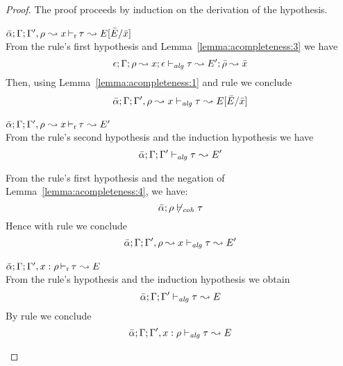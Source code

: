 \begin{proof}
The proof proceeds by induction on the derivation of the hypothesis.
\begin{description}
\setlength{\itemsep}{1em}
\item[\fbox{\texttt{(L-RuleMatch)}}]\quad$\bar{\alpha};\Gamma; \Gamma', \rho~{\leadsto x} \mathop{\vdash_{\mathrm{r}}} \tau~{\leadsto E[\bar{E}/\bar{x}]}$ \ \\
From the rule's first hypothesis and Lemma~\ref{lemma:acompleteness:3} we have
\begin{equation*}
\epsilon; \Gamma; \rho \leadsto x; \epsilon \vdash_{\mathit{alg}} \tau \leadsto E'; \bar{\rho} \leadsto \bar{x}
\end{equation*}
Then, using Lemma~\ref{lemma:acompleteness:1} and rule  we conclude
\begin{equation*}
\bar{\alpha};\Gamma; \Gamma', \rho~{\leadsto x} \vdash_{\mathit{alg}} \tau~{\leadsto E[\bar{E}/\bar{x}]}
\end{equation*}

\item[\fbox{\texttt{(L-RuleNoMatch)}}]\quad$\bar{\alpha};\Gamma;\Gamma', \rho~{\leadsto x}\mathop{\vdash_{\mathrm{r}}} \tau~{\leadsto E'}$ \ \\
  From the rule's second hypothesis and the induction hypothesis we have
\begin{equation*}
  \bar{\alpha};\Gamma;\Gamma' \vdash_{\mathit{alg}} \tau~{\leadsto E'}
\end{equation*}

  From the rule's first hypothesis and the negation of Lemma~\ref{lemma:acompleteness:4}, we have:
\begin{equation*}
\bar{\alpha}; \rho \not\vdash_{\mathit{coh}} \tau
\end{equation*}
  Hence with rule  we conclude
\begin{equation*}
  \bar{\alpha};\Gamma;\Gamma',\rho \leadsto x \vdash_{\mathit{alg}} \tau~{\leadsto E'}
\end{equation*}

\item[\fbox{\texttt{(L-Var)}}]\quad$\bar{\alpha};\Gamma;\Gamma',x:\rho \mathop{\vdash_{\mathrm{r}}} \tau~{\leadsto E}$ \ \\
From the rule's hypothesis and the induction hypothesis we obtain
\begin{equation*}
  \bar{\alpha};\Gamma;\Gamma' \vdash_{\mathit{alg}} \tau~{\leadsto E}
\end{equation*}
By rule  we conclude
\begin{equation*}
  \bar{\alpha};\Gamma;\Gamma',x:\rho \vdash_{\mathit{alg}} \tau~{\leadsto E}
\end{equation*}


\end{description}
\end{proof}
